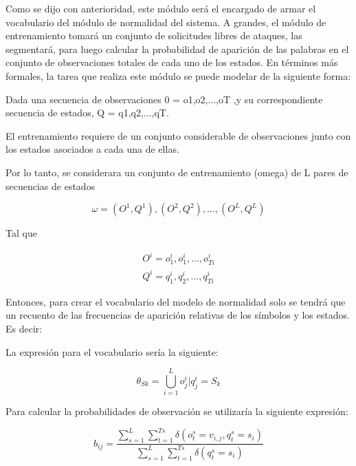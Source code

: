 Como se dijo con anterioridad, este módulo será el encargado de armar el vocabulario del módulo de normalidad del sistema. A grandes, el módulo de entrenamiento tomará un conjunto de solicitudes libres de ataques, las segmentará, para luego calcular la probabilidad de aparición de las palabras en el conjunto de observaciones totales de cada uno de los estados. En términos más formales, la  tarea que realiza este módulo se puede modelar de la siguiente forma:

Dada una secuencia de observaciones 0 = o1,o2,...,oT ,y  su correspondiente secuencia de estados, Q = q1,q2,...,qT.

El entrenamiento requiere de un conjunto considerable de observaciones  junto con los estados asociados a cada una de ellas.

Por lo tanto, se considerara un conjunto de entrenamiento (omega) de L pares de secuencias de estados

\begin{equation}
\omega = {(O^{1},Q^{1}),(O^{2},Q^{2}),...,(O^{L},Q^{L})}
\end{equation}

Tal que

\begin{equation}
\begin{aligned}
O^{i} = {o_{1}^{i},o_{1}^{i},...,o_{Ti}^{i}} \\
Q^{i} = {q_{1}^{i},q_{2}^{i},...,q_{Ti}^{i}}
\end{aligned}
\end{equation}

Entonces, para crear el vocabulario del modelo de normalidad solo se tendrá que un recuento de las frecuencias de aparición relativas de los símbolos y los estados. Es decir:

La expresión para el vocabulario sería la siguiente:

\begin{equation}
\theta_{Sk} = \bigcup\limits_{i=1}^{L} {o_{j}^{i}|q_{j}^{i} = S_{k}}
\end{equation}

Para calcular la probabilidades de observación se utilizaría la siguiente expresión:

\begin{equation}\label{eq:entrenamiento}
b_{ij} = \frac{\sum_{s=1}^{L}\sum_{t=1}^{Ts}\delta(o_{t}^{s} = v_{i,j} ,q_{t}^{s} = s_{i} )}{\sum_{s=1}^{L}\sum_{t=1}^{Ts}\delta(q_{t}^{s} = s_{i}) }
\end{equation}

